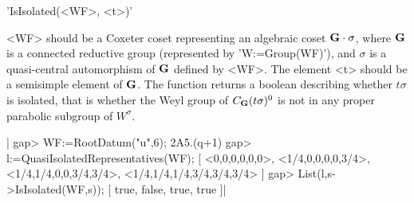 'IsIsolated(<WF>, <t>)'

<WF>   should  be   a  Coxeter   coset  representing   an  algebraic  coset
${\bf G}\cdot\sigma$,  where ${\bf G}$ is a  connected reductive group (represented
by  'W:=Group(WF)'), and $\sigma$ is  a quasi-central automorphism of ${\bf G}$
defined  by <WF>. The element <t> should  be a semisimple element of ${\bf G}$.
The  function returns a  boolean describing whether  $t\sigma$ is isolated,
that  is whether the Weyl group of  $C_{\bf G}(t\sigma)^0$ is not in any proper
parabolic subgroup of $W^\sigma$.

|    gap> WF:=RootDatum("u",6);
    2A5.(q+1)
    gap> l:=QuasiIsolatedRepresentatives(WF);
    [ <0,0,0,0,0,0>, <1/4,0,0,0,0,3/4>, <1/4,1/4,0,0,3/4,3/4>,
      <1/4,1/4,1/4,3/4,3/4,3/4> ]
    gap> List(l,s->IsIsolated(WF,s));
    [ true, false, true, true ]|

